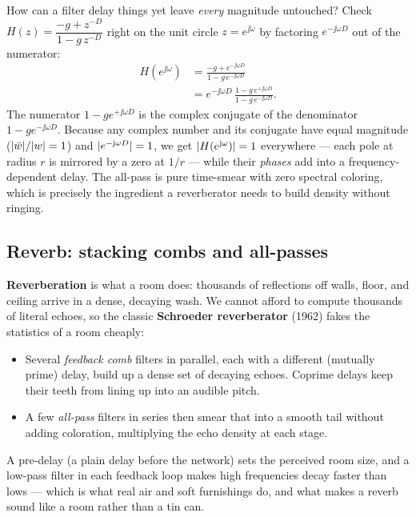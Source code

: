 \begin{whybox}
How can a filter delay things yet leave \emph{every} magnitude untouched? Check
$H(z)=\dfrac{-g+z^{-D}}{1-g\,z^{-D}}$ right on the unit circle $z = e^{\jj\omega}$ by factoring $e^{-\jj\omega D}$ out of the numerator:
\begin{align*}
H(e^{\jj\omega}) &= \frac{-g + e^{-\jj\omega D}}{1 - g\,e^{-\jj\omega D}} \\
&= e^{-\jj\omega D}\,\frac{1 - g\,e^{+\jj\omega D}}{1 - g\,e^{-\jj\omega D}}.
\end{align*}
The numerator $1 - g e^{+\jj\omega D}$ is the complex conjugate of the denominator $1 - g e^{-\jj\omega D}$. Because any complex number and its conjugate have equal magnitude ($\lvert\bar w\rvert/\lvert w\rvert = 1$) and $\lvert e^{-\mathrm{j}\omega D}\rvert = 1$, we get $\lvert H(e^{\mathrm{j}\omega})\rvert = 1$ everywhere --- each pole at radius $r$ is mirrored by a zero at $1/r$ --- while their \emph{phases} add into a frequency-dependent delay. The all-pass is
pure time-smear with zero spectral coloring, which is precisely the ingredient a
reverberator needs to build density without ringing.
\end{whybox}

\subsection{Reverb: stacking combs and all-passes}

\textbf{Reverberation} is what a room does: thousands of reflections off walls,
floor, and ceiling arrive in a dense, decaying wash. We cannot afford to compute
thousands of literal echoes, so the classic \textbf{Schroeder reverberator}
(1962) fakes the statistics of a room cheaply:
\begin{itemize}
  \item Several \emph{feedback comb} filters in parallel, each with a different
        (mutually prime) delay, build up a dense set of decaying echoes. Coprime
        delays keep their teeth from lining up into an audible pitch.
  \item A few \emph{all-pass} filters in series then smear that into a smooth
        tail without adding coloration, multiplying the echo density at each
        stage.
\end{itemize}
A pre-delay (a plain delay before the network) sets the perceived room size, and
a low-pass filter in each feedback loop makes high frequencies decay faster than
lows --- which is what real air and soft furnishings do, and what makes a reverb
sound like a room rather than a tin can.

